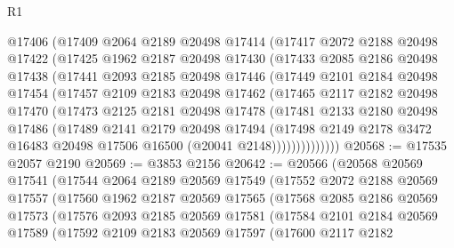 \begin{lexlean}{R1}
\begin{coremodule}
      @17406
      (@17409
        @2064
        @2189
        @20498
        @17414
        (@17417
          @2072
          @2188
          @20498
          @17422
          (@17425
            @1962
            @2187
            @20498
            @17430
            (@17433
              @2085
              @2186
              @20498
              @17438
              (@17441
                @2093
                @2185
                @20498
                @17446
                (@17449
                  @2101
                  @2184
                  @20498
                  @17454
                  (@17457
                    @2109
                    @2183
                    @20498
                    @17462
                    (@17465
                      @2117
                      @2182
                      @20498
                      @17470
                      (@17473
                        @2125
                        @2181
                        @20498
                        @17478
                        (@17481
                          @2133
                          @2180
                          @20498
                          @17486
                          (@17489
                            @2141
                            @2179
                            @20498
                            @17494
                            (@17498
                              @2149
                              @2178
                              @3472
                              @16483
                              @20498
                              @17506
                              @16500
                              (@20041 @2148))))))))))))))
@20568 := @17535 @2057 @2190
@20569 := @3853 @2156
@20642 := @20566
    (@20568
      @20569
      @17541
      (@17544
        @2064
        @2189
        @20569
        @17549
        (@17552
          @2072
          @2188
          @20569
          @17557
          (@17560
            @1962
            @2187
            @20569
            @17565
            (@17568
              @2085
              @2186
              @20569
              @17573
              (@17576
                @2093
                @2185
                @20569
                @17581
                (@17584
                  @2101
                  @2184
                  @20569
                  @17589
                  (@17592
                    @2109
                    @2183
                    @20569
                    @17597
                    (@17600
                      @2117
                      @2182

\end{coremodule}
\end{lexlean}
